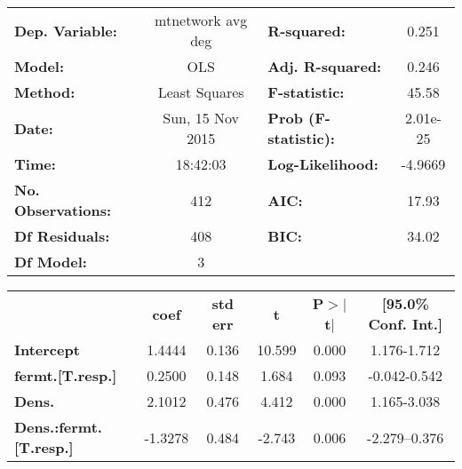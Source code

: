 \documentclass[10pt,letterpaper,oneside]{article}
\begin{document}
\begin{center}
\begin{tabular}{lclc}
\toprule
\textbf{Dep. Variable:}         &   mtnetwork avg deg    & \textbf{  R-squared:         } &     0.251   \\
\textbf{Model:}                 &       OLS        & \textbf{  Adj. R-squared:    } &     0.246   \\
\textbf{Method:}                &  Least Squares   & \textbf{  F-statistic:       } &     45.58   \\
\textbf{Date:}                  & Sun, 15 Nov 2015 & \textbf{  Prob (F-statistic):} &  2.01e-25   \\
\textbf{Time:}                  &     18:42:03     & \textbf{  Log-Likelihood:    } &   -4.9669   \\
\textbf{No. Observations:}      &         412      & \textbf{  AIC:               } &     17.93   \\
\textbf{Df Residuals:}          &         408      & \textbf{  BIC:               } &     34.02   \\
\textbf{Df Model:}              &           3      & \textbf{                     } &             \\
\bottomrule
\end{tabular}
\bigskip
\begin{tabular}{lccccc}
& \textbf{coef} & \textbf{std err} & \textbf{t} & \textbf{P$>$$|$t$|$} & \textbf{[95.0\% Conf. Int.]}  \\

\textbf{Intercept}              &       1.4444  &        0.136     &    10.599  &         0.000        &         1.176-1.712       \\
\textbf{fermt.[T.resp.]}        &       0.2500  &        0.148     &     1.684  &         0.093        &        -0.042-0.542       \\
\textbf{Dens.}                 &       2.1012  &        0.476     &     4.412  &         0.000        &         1.165-3.038       \\
\textbf{Dens.:fermt.[T.resp.]} &      -1.3278  &        0.484     &    -2.743  &         0.006        &        -2.279--0.376       \\
\bottomrule
\end{tabular}

\end{center}
\end{document}
